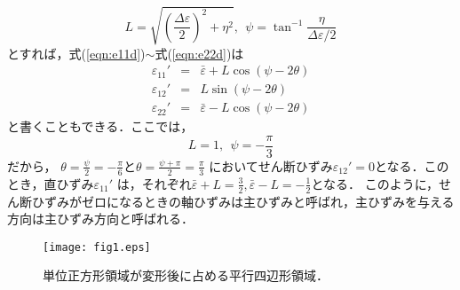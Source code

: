 \documentclass[10pt,a4j]{jarticle}
\begin{document}
\begin{enumerate}
\begin{equation}
		L=\sqrt{\left(\frac{\Delta \varepsilon}{2}\right)^2 + \eta ^2 }, 
		\ \ 
		\psi=\tan^{-1}\frac{\eta}{\Delta \varepsilon/2}
	\end{equation}
	とすれば，式(\ref{eqn:e11d})$\sim$式(\ref{eqn:e22d})は
	\begin{eqnarray}
		\varepsilon_{11}' &=& 
			\bar \varepsilon + 
			L \cos \left( \psi-2\theta  \right)	
			\label{eqn:e11d2}
			\\
		\varepsilon_{12}' &=& 
			L \sin \left( \psi-2\theta  \right)	
			\label{eqn:e12d2}
			\\
		\varepsilon_{22}' &=& 
			\bar \varepsilon - 
			L \cos \left( \psi-2\theta  \right)	
			\label{eqn:e22d2}
	\end{eqnarray}
	と書くこともできる．ここでは，
	\[
		L=1, \ \ \psi =-\frac{\pi}{3}
	\]
	だから，
	$\theta=\frac{\psi}{2}=-\frac{\pi}{6}$と$\theta=\frac{\psi+\pi}{2}=\frac{\pi}{3}$
	においてせん断ひずみ$\varepsilon_{12}'=0$となる．このとき，直ひずみ$\varepsilon_{11}'$
	は，それぞれ$\bar \varepsilon+L=\frac{3}{2}, \bar \varepsilon -L=-\frac{1}{2}$となる．
	このように，せん断ひずみがゼロになるときの軸ひずみは主ひずみと呼ばれ，主ひずみを与える
	方向は主ひずみ方向と呼ばれる．
\end{enumerate}
\begin{figure}[h]
	\begin{center}
	\texttt{[image: fig1.eps]} 
	\end{center}
	\vspace{-5mm}
	\caption{単位正方形領域が変形後に占める平行四辺形領域．} 
	\label{fig:fig1}
\end{figure}
\end{document}
